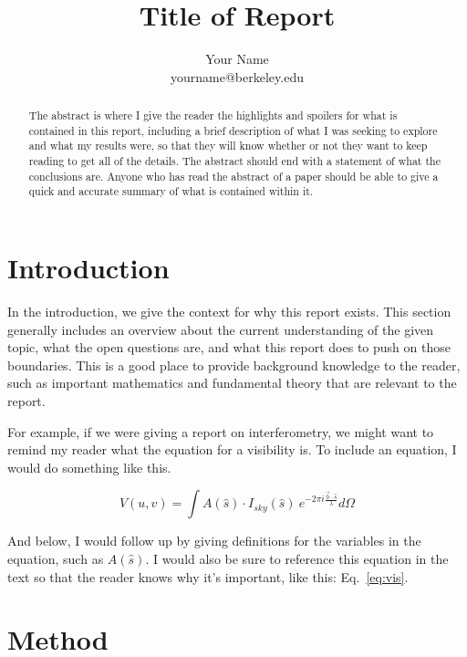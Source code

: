\documentclass[preprint]{aastex}
\makeatletter
\newcommand{\thetitle}{Title of Report}
\newcommand{\theauthor}{Your Name}
\newcommand{\theauthorsemail}{yourname@berkeley.edu}
\makeatother
\begin{document}
\title{
    \sffamily\bfseries\huge
    \thetitle \\
}
\author{
    \sffamily\theauthor \\
    \sffamily\theauthorsemail
}
\begin{abstract}
The abstract is where I give the reader the highlights and spoilers for what is 
contained in this report, including a brief description of what I was seeking 
to explore and what my results were, so that they will know whether or not they 
want to keep reading to get all of the details. The abstract should end with a 
statement of what the conclusions are.  Anyone who has read the abstract of a 
paper should be able to give a quick and accurate summary of what is contained 
within it.
\end{abstract}

\section{Introduction}

In the introduction, we give the context for why this report exists. This 
section generally includes an overview about the current understanding of the 
given topic, what the open questions are, and what this report does to push on 
those boundaries. This is a good place to provide background knowledge to the 
reader, such as important mathematics and fundamental theory that are relevant 
to the report.

For example, if we were giving a report on interferometry, we might want to remind 
my reader what the equation for a visibility is. To include an equation, I 
would do something like this.

\begin{equation}
    \label{eq:vis}
    V(u,v) = \int A(\hat{s}) \cdot I_{sky}(\hat{s}) ~e^{-2 \pi i \frac{\vec{b} 
    \cdot \hat{s}}{\lambda}} d\Omega
\end{equation}

And below, I would follow up by giving definitions for the variables in the 
equation, such as $A(\hat{s})$. I would also be sure to reference this equation 
in the text so that the reader knows why it's important, like this: 
Eq.~\eqref{eq:vis}.

\section{Method}
\end{document}

